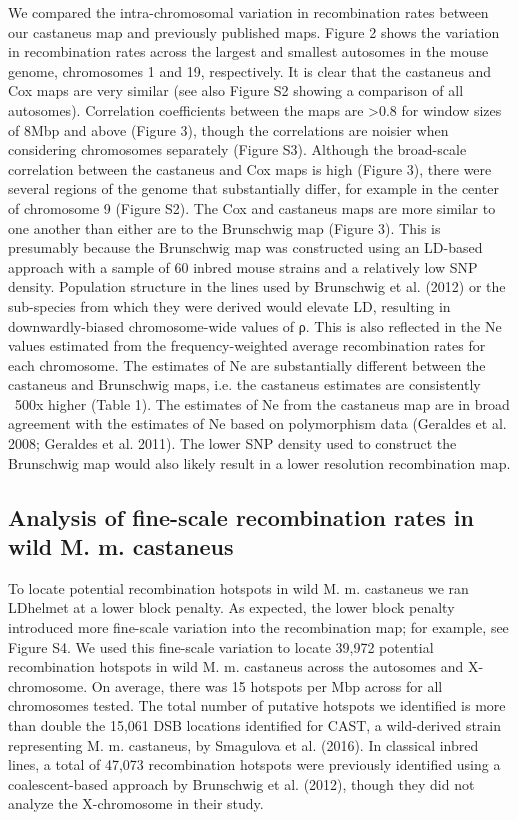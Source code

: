         	We compared the intra-chromosomal variation in recombination rates between our castaneus map and previously published maps. Figure 2 shows the variation in recombination rates across the largest and smallest autosomes in the mouse genome, chromosomes 1 and 19, respectively. It is clear that the castaneus and Cox maps are very similar (see also Figure S2 showing a comparison of all autosomes). Correlation coefficients between the maps are >0.8 for window sizes of 8Mbp and above (Figure 3), though the correlations are noisier when considering chromosomes separately (Figure S3). Although the broad-scale correlation between the castaneus and Cox maps is high (Figure 3), there were several regions of the genome that substantially differ, for example in the center of chromosome 9 (Figure S2). The Cox and castaneus maps are more similar to one another than either are to the Brunschwig map (Figure 3). This is presumably because the Brunschwig map was constructed using an LD-based approach with a sample of 60 inbred mouse strains and a relatively low SNP density. Population structure in the lines used by Brunschwig et al. (2012) or the sub-species from which they were derived would elevate LD, resulting in downwardly-biased chromosome-wide values of ρ. This is also reflected in the Ne values estimated from the frequency-weighted average recombination rates for each chromosome. The estimates of Ne are substantially different between the castaneus and Brunschwig maps, i.e. the castaneus estimates are consistently ~500x higher (Table 1). The estimates of Ne from the castaneus map are in broad agreement with the estimates of Ne based on polymorphism data (Geraldes et al. 2008; Geraldes et al. 2011). The lower SNP density used to construct the Brunschwig map would also likely result in a lower resolution recombination map.

\subsection{Analysis of fine-scale recombination rates in wild M. m. castaneus}


	To locate potential recombination hotspots in wild M. m. castaneus we ran LDhelmet at a lower block penalty. As expected, the lower block penalty introduced more fine-scale variation into the recombination map; for example, see Figure S4. We used this fine-scale variation to locate 39,972 potential recombination hotspots in wild M. m. castaneus across the autosomes and X-chromosome. On average, there was 15 hotspots per Mbp across for all chromosomes tested. The total number of putative hotspots we identified is more than double the 15,061 DSB locations identified for CAST, a wild-derived strain representing M. m. castaneus, by Smagulova et al. (2016). In classical inbred lines, a total of 47,073 recombination hotspots were previously identified using a coalescent-based approach by Brunschwig et al. (2012), though they did not analyze the X-chromosome in their study. 

